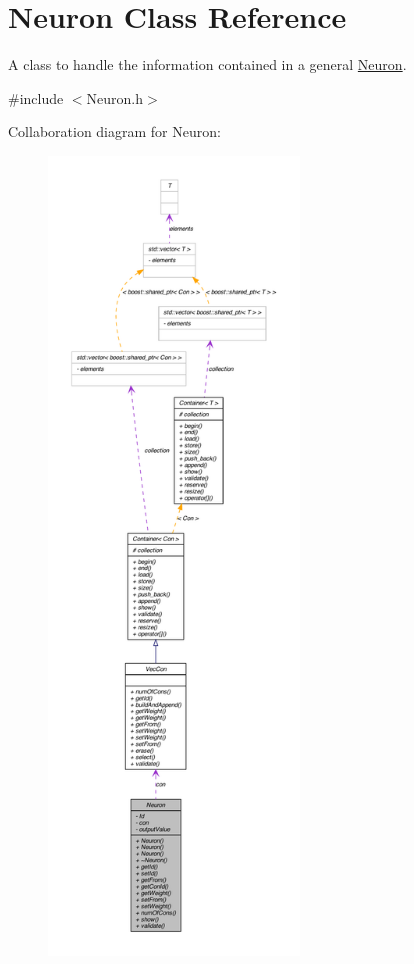 \hypertarget{class_neuron}{
\section{Neuron Class Reference}
\label{class_neuron}
}


A class to handle the information contained in a general \hyperlink{class_neuron}{Neuron}.  




{\ttfamily \#include $<$Neuron.h$>$}



Collaboration diagram for Neuron:\nopagebreak
\begin{figure}[H]
\begin{center}
\leavevmode
\includegraphics[height=600pt]{class_neuron__coll__graph}
\end{center}
\end{figure}

